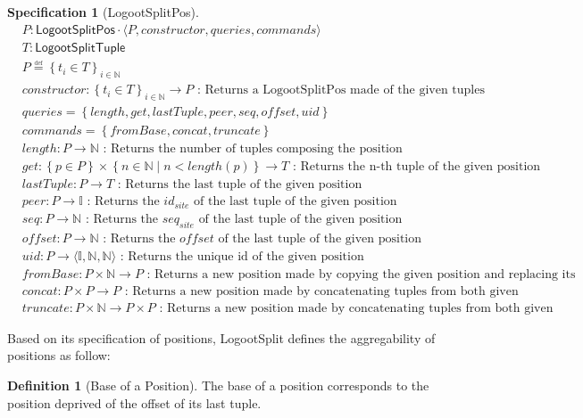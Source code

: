 \documentclass{article}
\newcommand{\commands}[1]{commands = \set{#1}}
\newcommand{\defeq}{\overset{\underset{\mathrm{def}}{}}{=}}
\newcommand{\fnspec}[3]{#1: #2 \text{ : #3}}
\newcommand{\inbb}[1]{\in \mathbb{#1}}
\newcommand{\mathlist}[2]{\set{#1_i \in #2}_{i \inbb{N}}}
\newcommand{\queries}[1]{queries = \set{#1}}
\newcommand{\set}[1]{\left\{#1\right\}} %
\newcommand{\spectuple}[1]{\tuple{#1, constructor, queries, commands}}
\newcommand{\ssep}{\mid} %
\newcommand{\tuple}[1]{\langle #1 \rangle}
\newcounter{definition-counter}
\theoremstyle{definition}
\newtheorem{definition}[definition-counter]{Definition}
\theoremstyle{definition}
\theoremstyle{definition}
\newcounter{specificationcounter}
\theoremstyle{definition}
\newtheorem{specification}[specificationcounter]{Specification}
\begin{document}
\begin{specification}[LogootSplitPos]
    \begin{align*}
    &P: \mathsf{LogootSplitPos} \cdot \spectuple{P}\\
    &T: \mathsf{LogootSplitTuple}\\
    &P \defeq \mathlist{t}{T}\\
    &\fnspec{constructor}{\mathlist{t}{T} \to P}{Returns a LogootSplitPos made of the given tuples}\\
    &\queries{length, get, lastTuple, peer, seq, offset, uid}\\
    &\commands{fromBase, concat, truncate}\\
    &\fnspec{length}{P \to \mathbb{N}}{Returns the number of tuples composing the position}\\
    &\fnspec{get}{\set{p \in P} \times \set{n \inbb{N} \ssep n < length(p)} \to T}{Returns the n-th tuple of the given position}\\
    &\fnspec{lastTuple}{P \to T}{Returns the last tuple of the given position}\\
    &\fnspec{peer}{P \to \mathbb{I}}{Returns the $id_{site}$ of the last tuple of the given position}\\
    &\fnspec{seq}{P \to \mathbb{N}}{Returns the $seq_{site}$ of the last tuple of the given position}\\
    &\fnspec{offset}{P \to \mathbb{N}}{Returns the $offset$ of the last tuple of the given position}\\
    &\fnspec{uid}{P \to \tuple{\mathbb{I}, \mathbb{N}, \mathbb{N}}}{Returns the unique id of the given position}\\
    &\fnspec{fromBase}{P \times \mathbb{N} \to P}{Returns a new position made by copying the given position and replacing its offset...}\\
    &\fnspec{concat}{P \times P \to P}{Returns a new position made by concatenating tuples from both given positions}\\
    &\fnspec{truncate}{P \times \mathbb{N} \to P \times P}{Returns a new position made by concatenating tuples from both given positions}
    \end{align*}
    \label{spec:logootsplit-pos}
\end{specification}

Based on its specification of positions, LogootSplit defines the aggregability of positions as follow:

\begin{definition}[Base of a Position]
    The base of a position corresponds to the position deprived of the offset of its last tuple.
\end{definition}
\end{document}
